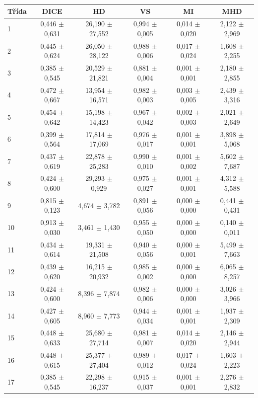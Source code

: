 \begin{tabular}{l c c c c c}
 \hline
Třída & DICE & HD & VS & MI & MHD \\ \hline
1 & 0,446 $\pm$ 0,631 & 26,190 $\pm$ 27,552 & 0,994 $\pm$ 0,005 & 0,014 $\pm$ 0,020 & 2,122 $\pm$ 2,969 \\
2 & 0,445 $\pm$ 0,624 & 26,050 $\pm$ 28,122 & 0,988 $\pm$ 0,006 & 0,017 $\pm$ 0,024 & 1,608 $\pm$ 2,255 \\
3 & 0,385 $\pm$ 0,545 & 20,529 $\pm$ 21,821 & 0,881 $\pm$ 0,004 & 0,001 $\pm$ 0,001 & 2,180 $\pm$ 2,855 \\
4 & 0,472 $\pm$ 0,667 & 13,954 $\pm$ 16,571 & 0,982 $\pm$ 0,003 & 0,003 $\pm$ 0,005 & 2,439 $\pm$ 3,316 \\
5 & 0,454 $\pm$ 0,642 & 15,198 $\pm$ 14,423 & 0,967 $\pm$ 0,042 & 0,002 $\pm$ 0,003 & 2,021 $\pm$ 2,649 \\
6 & 0,399 $\pm$ 0,564 & 17,814 $\pm$ 17,069 & 0,976 $\pm$ 0,017 & 0,001 $\pm$ 0,001 & 3,898 $\pm$ 5,068 \\
7 & 0,437 $\pm$ 0,619 & 22,878 $\pm$ 25,283 & 0,990 $\pm$ 0,010 & 0,001 $\pm$ 0,002 & 5,602 $\pm$ 7,687 \\
8 & 0,424 $\pm$ 0,600 & 29,293 $\pm$ 0,929 & 0,975 $\pm$ 0,027 & 0,001 $\pm$ 0,001 & 4,312 $\pm$ 5,588 \\
9 & 0,815 $\pm$ 0,123 & 4,674 $\pm$ 3,782 & 0,891 $\pm$ 0,056 & 0,000 $\pm$ 0,000 & 0,441 $\pm$ 0,431 \\
10 & 0,913 $\pm$ 0,030 & 3,461 $\pm$ 1,430 & 0,955 $\pm$ 0,050 & 0,000 $\pm$ 0,000 & 0,140 $\pm$ 0,011 \\
11 & 0,434 $\pm$ 0,614 & 19,331 $\pm$ 21,508 & 0,940 $\pm$ 0,056 & 0,000 $\pm$ 0,001 & 5,499 $\pm$ 7,663 \\
12 & 0,439 $\pm$ 0,620 & 16,215 $\pm$ 20,932 & 0,985 $\pm$ 0,002 & 0,000 $\pm$ 0,000 & 6,065 $\pm$ 8,257 \\
13 & 0,424 $\pm$ 0,600 & 8,396 $\pm$ 7,874 & 0,982 $\pm$ 0,006 & 0,000 $\pm$ 0,000 & 3,026 $\pm$ 3,966 \\
14 & 0,427 $\pm$ 0,605 & 8,960 $\pm$ 7,773 & 0,944 $\pm$ 0,034 & 0,001 $\pm$ 0,001 & 1,937 $\pm$ 2,309 \\
15 & 0,448 $\pm$ 0,633 & 25,680 $\pm$ 27,714 & 0,981 $\pm$ 0,007 & 0,014 $\pm$ 0,020 & 2,146 $\pm$ 2,944 \\
16 & 0,448 $\pm$ 0,615 & 25,377 $\pm$ 27,404 & 0,989 $\pm$ 0,012 & 0,017 $\pm$ 0,024 & 1,603 $\pm$ 2,223 \\
17 & 0,385 $\pm$ 0,545 & 22,298 $\pm$ 16,237 & 0,915 $\pm$ 0,037 & 0,001 $\pm$ 0,001 & 2,276 $\pm$ 2,832 \\

\end{tabular}
